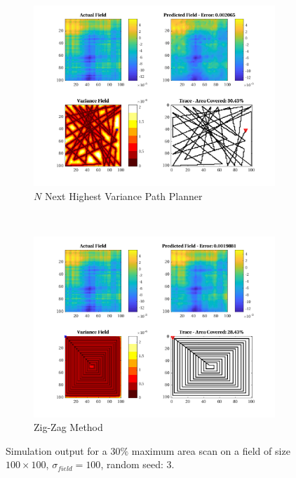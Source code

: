 \begin{figure}[htb!]
\begin{subfigure}[t]{0.5\textwidth}
    \end{subfigure}%
    \\
    \begin{subfigure}[t]{0.5\textwidth}
        \centering
        \includegraphics[width=\linewidth]{figures/hbresults/nnhv_30p_100x100_sf_100_seed_3.png}
        \captionsetup{skip=0.10\baselineskip,size=footnotesize}
        \caption{$N$ Next Highest Variance Path Planner}
    \end{subfigure}%
    ~
    \begin{subfigure}[t]{0.5\textwidth}
        \centering
        \includegraphics[width=\linewidth]{figures/hbresults/zz_30p_100x100_sf_100_seed_3.png}
        \captionsetup{skip=0.10\baselineskip,size=footnotesize}
        \caption{Zig-Zag Method}
    \end{subfigure}%
    \captionsetup{skip=0.20\baselineskip}
    \caption{Simulation output for a $30\%$ maximum area scan on a field of size $100 \times 100$, $\sigma_{field} = 100$, random seed: 3.}
    \label{fig:sim_sigma100_p30_s3}
\end{figure}

